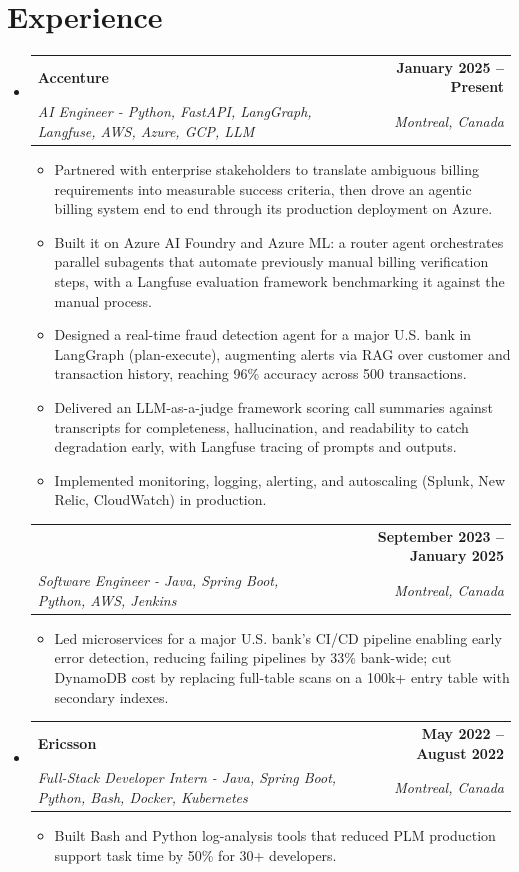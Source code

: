 \documentclass[letterpaper,11pt]{article}
\makeatletter
\newcommand{\resumeItem}[1]{
  \item\small{{#1 \vspace{-2pt}}}
}
\newcommand{\resumeSubheading}[4]{
  \vspace{-2pt}\item
    \begin{tabular*}{1.0\textwidth}[t]{l@{\extracolsep{\fill}}r}
      \textbf{#1} & \textbf{\small #2} \\
      \textit{\small#3} & \textit{\small #4} \\
    \end{tabular*}\vspace{-7pt}
}
\newcommand{\resumeSubheadingContinued}[3]{
  \vspace{4pt}
    \begin{tabular*}{1.0\textwidth}[t]{l@{\extracolsep{\fill}}r}
      & \textbf{\small #2} \\
      \textit{\small#1} & \textit{\small #3} \\
    \end{tabular*}\vspace{-7pt}
}
\newcommand{\resumeSubHeadingListStart}{\begin{itemize}[leftmargin=0.0in, label={}]}
\newcommand{\resumeSubHeadingListEnd}{\end{itemize}}
\newcommand{\resumeItemListStart}{\begin{itemize}}
\newcommand{\resumeItemListEnd}{\end{itemize}\vspace{-5pt}}
\makeatother
\begin{document}
\section{Experience}
  \resumeSubHeadingListStart

    \resumeSubheading
      {Accenture}{January 2025 -- Present}
      {AI Engineer - Python, FastAPI, LangGraph, Langfuse, AWS, Azure, GCP, LLM}{Montreal, Canada}
      \resumeItemListStart
        \resumeItem{Partnered with enterprise stakeholders to translate ambiguous billing requirements into measurable success criteria, then drove an agentic billing system end to end through its production deployment on Azure.}
        \resumeItem{Built it on Azure AI Foundry and Azure ML: a router agent orchestrates parallel subagents that automate previously manual billing verification steps, with a Langfuse evaluation framework benchmarking it against the manual process.}
        \resumeItem{Designed a real-time fraud detection agent for a major U.S. bank in LangGraph (plan-execute), augmenting alerts via RAG over customer and transaction history, reaching 96\% accuracy across 500 transactions.}
        \resumeItem{Delivered an LLM-as-a-judge framework scoring call summaries against transcripts for completeness, hallucination, and readability to catch degradation early, with Langfuse tracing of prompts and outputs.}
        \resumeItem{Implemented monitoring, logging, alerting, and autoscaling (Splunk, New Relic, CloudWatch) in production.}
      \resumeItemListEnd
      \vspace{-5pt}

    \resumeSubheadingContinued
      {Software Engineer - Java, Spring Boot, Python, AWS, Jenkins}{September 2023 -- January 2025}{Montreal, Canada}
      \resumeItemListStart
        \resumeItem{Led microservices for a major U.S. bank's CI/CD pipeline enabling early error detection, reducing failing pipelines by 33\% bank-wide; cut DynamoDB cost by replacing full-table scans on a 100k+ entry table with secondary indexes.}
      \resumeItemListEnd

    \resumeSubheading
      {Ericsson}{May 2022 -- August 2022}
      {Full-Stack Developer Intern - Java, Spring Boot, Python, Bash, Docker, Kubernetes}{Montreal, Canada}
      \resumeItemListStart
        \resumeItem{Built Bash and Python log-analysis tools that reduced PLM production support task time by 50\% for 30+ developers.}
      \resumeItemListEnd

  \resumeSubHeadingListEnd
\vspace{-14pt}
\end{document}

